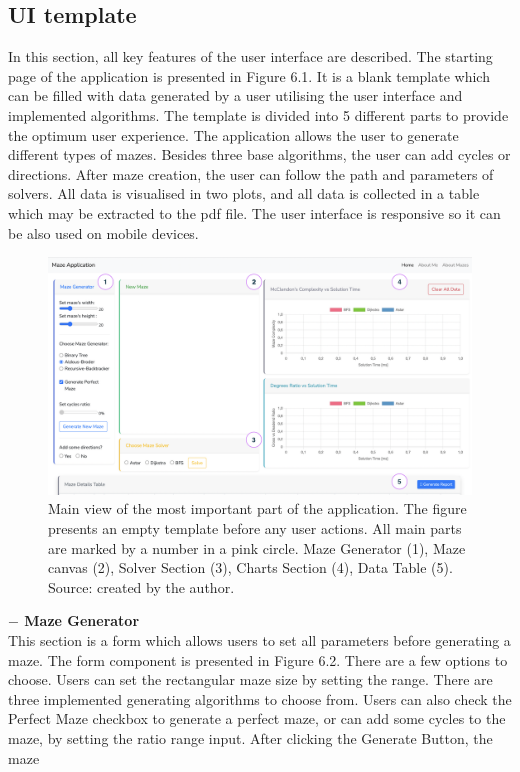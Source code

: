 \subsection{UI template}
In this section, all key features of the user interface are described. The starting page of the application is presented in Figure 6.1. It is a blank template which can be
filled with data generated by a user utilising the user interface and implemented algorithms. The template is divided into 5 different parts to provide the optimum
user experience. The application allows the user to generate different types of mazes. Besides three base algorithms, the user can add cycles or directions.
After maze creation, the user can follow the path and parameters of solvers. All data is visualised in two plots, and all data is collected in a table which may be extracted to
the pdf file. The user interface is responsive so it can be also used on mobile devices.
\begin{figure}[!h]
    \centering
    \includegraphics[width=0.9\linewidth]{templateView}
    \caption{Main view of the most important part of the application. The figure presents an empty template before any user actions. All main parts are 
    marked by a number in a pink circle. Maze Generator (1), Maze canvas (2), Solver Section (3), Charts Section (4), Data Table (5).\\ Source: created by the author.}
    \end{figure}
\newpage
\textbf{$-$ Maze Generator}\\
This section is a form which allows users to set all parameters before generating a maze. The form component is presented in Figure 6.2. There are a few options to
choose. Users can set the rectangular maze size by setting the range. There are three implemented generating algorithms to choose from. Users can also check the
Perfect Maze checkbox to generate a perfect maze, or can add some cycles to the maze, by setting the ratio range input. After clicking the Generate Button, the maze
